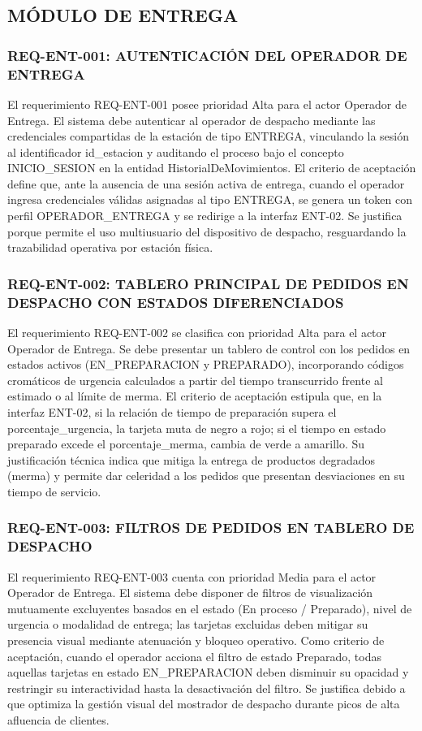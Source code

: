 \subsection{MÓDULO DE ENTREGA}

\subsubsection{REQ-ENT-001: AUTENTICACIÓN DEL OPERADOR DE ENTREGA}
El requerimiento REQ-ENT-001 posee prioridad Alta para el actor Operador de Entrega. El sistema debe autenticar al operador de despacho mediante las credenciales compartidas de la estación de tipo ENTREGA, vinculando la sesión al identificador id\_estacion y auditando el proceso bajo el concepto INICIO\_SESION en la entidad HistorialDeMovimientos. El criterio de aceptación define que, ante la ausencia de una sesión activa de entrega, cuando el operador ingresa credenciales válidas asignadas al tipo ENTREGA, se genera un token con perfil OPERADOR\_ENTREGA y se redirige a la interfaz ENT-02. Se justifica porque permite el uso multiusuario del dispositivo de despacho, resguardando la trazabilidad operativa por estación física.

\subsubsection{REQ-ENT-002: TABLERO PRINCIPAL DE PEDIDOS EN DESPACHO CON ESTADOS DIFERENCIADOS}
El requerimiento REQ-ENT-002 se clasifica con prioridad Alta para el actor Operador de Entrega. Se debe presentar un tablero de control con los pedidos en estados activos (EN\_PREPARACION y PREPARADO), incorporando códigos cromáticos de urgencia calculados a partir del tiempo transcurrido frente al estimado o al límite de merma. El criterio de aceptación estipula que, en la interfaz ENT-02, si la relación de tiempo de preparación supera el porcentaje\_urgencia, la tarjeta muta de negro a rojo; si el tiempo en estado preparado excede el porcentaje\_merma, cambia de verde a amarillo. Su justificación técnica indica que mitiga la entrega de productos degradados (merma) y permite dar celeridad a los pedidos que presentan desviaciones en su tiempo de servicio.

\subsubsection{REQ-ENT-003: FILTROS DE PEDIDOS EN TABLERO DE DESPACHO}
El requerimiento REQ-ENT-003 cuenta con prioridad Media para el actor Operador de Entrega. El sistema debe disponer de filtros de visualización mutuamente excluyentes basados en el estado (En proceso / Preparado), nivel de urgencia o modalidad de entrega; las tarjetas excluidas deben mitigar su presencia visual mediante atenuación y bloqueo operativo. Como criterio de aceptación, cuando el operador acciona el filtro de estado Preparado, todas aquellas tarjetas en estado EN\_PREPARACION deben disminuir su opacidad y restringir su interactividad hasta la desactivación del filtro. Se justifica debido a que optimiza la gestión visual del mostrador de despacho durante picos de alta afluencia de clientes.


